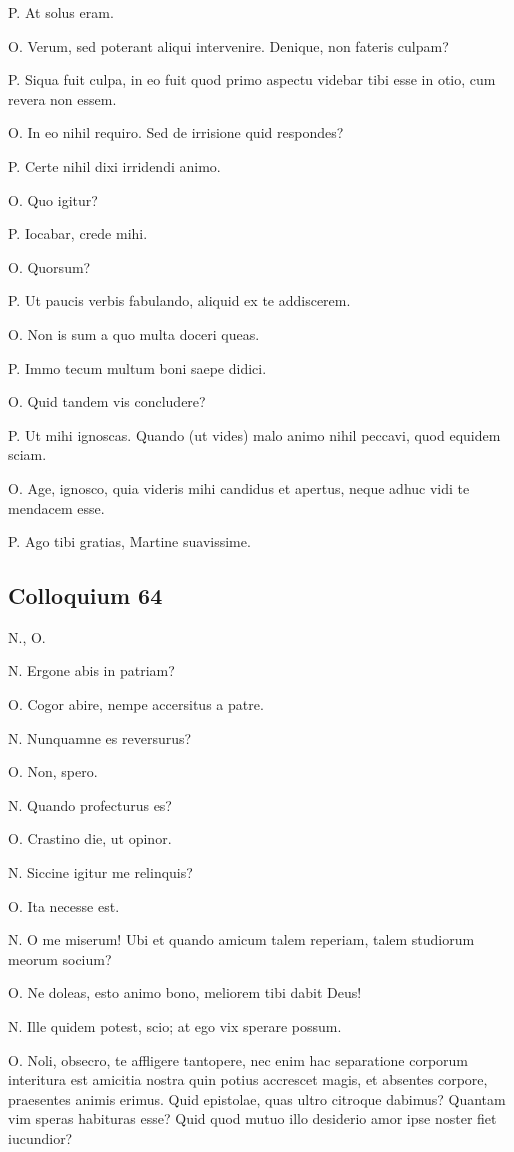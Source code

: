 \documentclass{article}
\begin{document}
P. At solus eram. 

O. Verum, sed poterant aliqui intervenire. Denique, non fateris culpam? 

P. Siqua fuit culpa, in eo fuit quod primo aspectu videbar tibi esse in otio, cum revera non essem. 

O. In eo nihil requiro. Sed de irrisione quid respondes?

P. Certe nihil dixi irridendi animo. 

O. Quo igitur?

P. Iocabar, crede mihi. 

O. Quorsum?

P. Ut paucis verbis fabulando, aliquid ex te addiscerem. 

O. Non is sum a quo multa doceri queas. 

P. Immo tecum multum boni saepe didici. 

O. Quid tandem vis concludere?

P. Ut mihi ignoscas. Quando (ut vides) malo animo nihil peccavi, quod equidem sciam. 

O. Age, ignosco, quia videris mihi candidus et apertus, neque adhuc vidi te mendacem esse. 

P. Ago tibi gratias, Martine suavissime.

\subsection{Colloquium 64}
N., O.

N. Ergone abis in patriam?

O. Cogor abire, nempe accersitus a patre. 

N. Nunquamne es reversurus?

O. Non, spero. 

N. Quando profecturus es?

O. Crastino die, ut opinor. 

N. Siccine igitur me relinquis?

O. Ita necesse est. 

N. O me miserum! Ubi et quando amicum talem reperiam, talem studiorum meorum socium?

O. Ne doleas, esto animo bono, meliorem tibi dabit Deus!

N. Ille quidem potest, scio; at ego vix sperare possum. 

O. Noli, obsecro, te affligere tantopere, nec enim hac separatione corporum interitura est amicitia nostra quin potius accrescet magis, et absentes corpore, praesentes animis erimus. Quid epistolae, quas ultro citroque dabimus? Quantam vim speras habituras esse? Quid quod mutuo illo desiderio amor ipse noster fiet iucundior?
\end{document}
